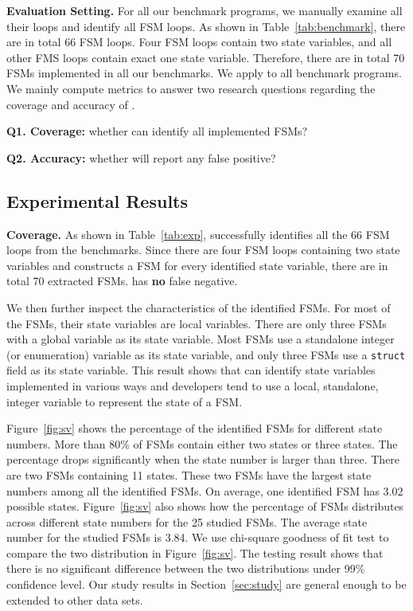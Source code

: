 \noindent\textbf{Evaluation Setting.} 
For all our benchmark programs, we manually examine all their loops and 
identify all FSM loops. 
As shown in Table~\ref{tab:benchmark}, there are in 
total 66 FSM loops.
Four FSM loops contain two state variables, 
and all other FMS loops contain exact one state variable.
Therefore, there are in total 70 FSMs implemented in all our benchmarks.  
We apply \Tool{} to all benchmark programs. 
We mainly compute metrics to answer two research 
questions regarding the coverage and accuracy of \Tool{}.

\textbf{Q1. Coverage:} whether \Tool{} can identify all implemented FSMs?
 
\textbf{Q2. Accuracy:} whether \Tool{} will report any false positive?

\subsection{Experimental Results}
\label{sec:results}



\noindent\textbf{Coverage.}
As shown in Table~\ref{tab:exp}, \Tool{} successfully identifies 
all the 66 FSM loops 
from the benchmarks. Since there are four FSM loops containing 
two state variables and \Tool{} constructs a FSM for every identified state variable, 
there are in total 70 extracted FSMs. 
\Tool{} has \textbf{no} false negative.

We then further inspect the characteristics of the identified FSMs.
For most of the FSMs, their state variables are local variables.
There are only three FSMs with a global variable as its state variable. 
Most FSMs use a standalone integer (or enumeration) variable as its state variable,
and only three FSMs use a \texttt{struct} field as its state variable.  
This result shows that \Tool{} can identify state variables implemented in various ways
and developers tend to use a local, standalone, integer variable to 
represent the state of a FSM.




Figure~\ref{fig:sv} shows the percentage of the identified FSMs
for different state numbers. 
More than 80\% of FSMs contain either two states or three states. 
The percentage drops significantly when the state number is larger than three. 
There are two FSMs containing 11 states. 
These two FSMs have the largest state numbers among all the identified FSMs. 
On average, one identified FSM has 3.02 possible states. 
Figure~\ref{fig:sv} also shows how the percentage of FSMs distributes 
across different state numbers 
for the 25 studied FSMs. 
The average state number for the studied FSMs is 3.84.
We use chi-square goodness of fit test to compare 
the two distribution in Figure~\ref{fig:sv}. 
The testing result shows that there is no significant 
difference between the two distributions 
under 99\% confidence level. 
Our study results in Section~\ref{sec:study} are general enough to be 
extended to other data sets. 

